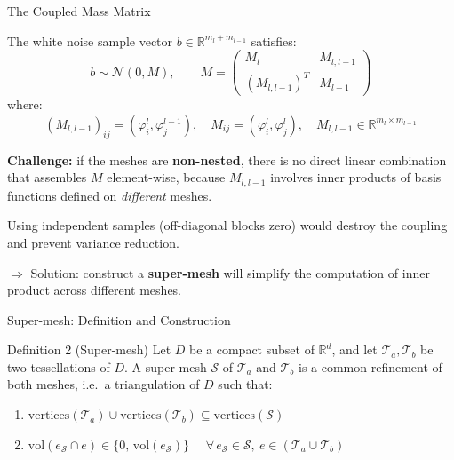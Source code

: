 \documentclass[
  english,            %
  aspectratio=169,    %
]{tumbeamer}
\begin{document}
\begin{frame}{The Coupled Mass Matrix}

The white noise sample vector $b \in \mathbb{R}^{m_l + m_{l-1}}$ satisfies:
\begin{equation}
  b \sim \mathcal{N}(0, M), \qquad
  M = \begin{pmatrix} M_l & M_{l,l-1} \\ (M_{l,l-1})^T & M_{l-1} \end{pmatrix}
\end{equation}
where:
\[
  (M_{l,l-1})_{ij} = (\varphi_i^l, \varphi_j^{l-1}),\quad
  M_{ij} = (\varphi_i^l, \varphi_j^l),\quad
  M_{l,l-1} \in \mathbb{R}^{m_l \times m_{l-1}}
\]

\bigskip
\textbf{Challenge:} if the meshes are \textbf{non-nested}, there is no direct linear
combination that assembles $M$ element-wise, because $M_{l,l-1}$ involves inner products
of basis functions defined on \emph{different} meshes.

\bigskip
Using independent samples (off-diagonal blocks zero) would destroy the coupling and
prevent variance reduction.

\bigskip
$\Rightarrow$ Solution: construct a \textbf{super-mesh} will simplify the computation of inner product across different meshes.

\end{frame}


\begin{frame}{Super-mesh: Definition and Construction}

\begin{block}{Definition 2 (Super-mesh)}
Let $D$ be a compact subset of $\mathbb{R}^d$, and let $\mathcal{T}_a, \mathcal{T}_b$ be
two tessellations of $D$. A super-mesh $\mathcal{S}$ of $\mathcal{T}_a$ and $\mathcal{T}_b$
is a common refinement of both meshes, i.e.\ a triangulation of $D$ such that:
\begin{enumerate}
  \item $\mathrm{vertices}(\mathcal{T}_a) \cup \mathrm{vertices}(\mathcal{T}_b)
        \subseteq \mathrm{vertices}(\mathcal{S})$
  \item $\mathrm{vol}(e_{\mathcal{S}} \cap e) \in \{0,\, \mathrm{vol}(e_{\mathcal{S}})\}$
        $\quad\forall\, e_{\mathcal{S}} \in \mathcal{S},\ e \in (\mathcal{T}_a \cup \mathcal{T}_b)$
\end{enumerate}
\end{block}

\end{frame}
\end{document}
